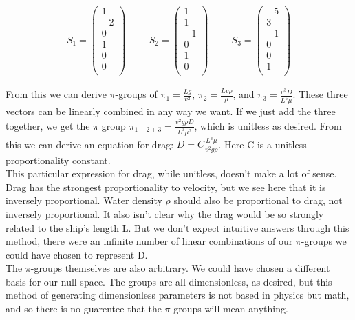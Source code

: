\documentclass[10pt]{article} %
\begin{document}
\begin{align*}
  S_1 =
  \begin{pmatrix}
    1\\
    -2\\
    0\\
    1\\
    0\\
    0\\
  \end{pmatrix}
  \hspace{1cm}
  S_2 =
  \begin{pmatrix}
    1\\
    1\\
    -1\\
    0\\
    1\\
    0\\
  \end{pmatrix}
  \hspace{1cm}
  S_3 =
  \begin{pmatrix}
    -5\\
    3\\
    -1\\
    0\\
    0\\
    1\\
  \end{pmatrix}
\end{align*}

From this we can derive $\pi$-groups of $\pi_1 = \frac{Lg}{v^2}$, $\pi_2 = \frac{Lv\rho}{\mu}$, and $\pi_3 = \frac{v^3D}{L^5\mu}$. These three vectors can be linearly combined in any way we want. If we just add the three together, we get the $\pi$ group $\pi_{1+2+3} = \frac{v^2g\rho D}{L^3\mu^2}$, which is unitless as desired. From this we can derive an equation for drag: $D = C\frac{L^3\mu}{v^2g\rho}$. Here C is a unitless proportionality constant.\\

This particular expression for drag, while unitless, doesn't make a lot of sense. Drag has the strongest proportionality to velocity, but we see here that it is inversely proportional. Water density $\rho$ should also be proportional to drag, not inversely proportional. It also isn't clear why the drag would be so strongly related to the ship's length L. But we don't expect intuitive answers through this method, there were an infinite number of linear combinations of our $\pi$-groups we could have chosen to represent D.\\

The $\pi$-groups themselves are also arbitrary. We could have chosen a different basis for our null space. The groups are all dimensionless, as desired, but this method of generating dimensionless parameters is not based in physics but math, and so there is no guarentee that the $\pi$-groups will mean anything.
\end{document}
